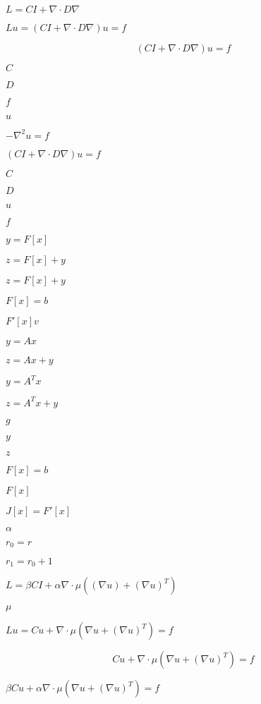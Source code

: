 \documentclass{article}
\begin{document}
$ L = C I + \nabla \cdot D \nabla$
\pagebreak

$ \mbox{$L u$} = \mbox{$(C I + \nabla \cdot D \nabla) u$} = f $
\pagebreak

\[ (C I + \nabla \cdot D \nabla) u = f \]
\pagebreak

$ C $
\pagebreak

$ D $
\pagebreak

$ f $
\pagebreak

$ u $
\pagebreak

$ -\nabla^2 u = f $
\pagebreak

$ (C I + \nabla \cdot D \nabla ) u = f $
\pagebreak

$C$
\pagebreak

$D$
\pagebreak

$u$
\pagebreak

$f$
\pagebreak

$ y=F[x] $
\pagebreak

$ z=F[x]+y $
\pagebreak

$z=F[x]+y$
\pagebreak

$F[x]=b$
\pagebreak

$ F'[x]v $
\pagebreak

$ y=Ax $
\pagebreak

$ z=Ax+y $
\pagebreak

$ y=A^{T} x $
\pagebreak

$ z=A^{T}x+y $
\pagebreak

$g$
\pagebreak

$y$
\pagebreak

$z$
\pagebreak

$ F[x]=b $
\pagebreak

$F[x]$
\pagebreak

$J[x] = F'[x]$
\pagebreak

$ \alpha $
\pagebreak

$ r_0 = r $
\pagebreak

$ r_1 = r_0 + 1 $
\pagebreak

$ L = \beta C I + \alpha \nabla \cdot \mu ( (\nabla u) + (\nabla u)^T ) $
\pagebreak

$ \mu $
\pagebreak

$ \mbox{$L u$} = C u + \nabla \cdot \mu (\nabla u + (\nabla u)^T) = f $
\pagebreak

\[ C u + \nabla \cdot \mu (\nabla u + (\nabla u)^T) = f \]
\pagebreak

$ \beta C u + \alpha \nabla \cdot \mu (\nabla u + (\nabla u)^T) = f $
\pagebreak
\end{document}
